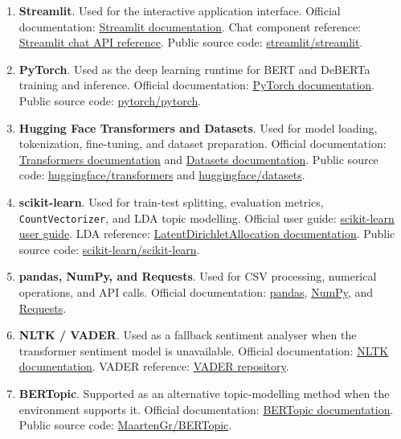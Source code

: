 \documentclass[11pt]{article}
\newcommand{\code}[1]{\texttt{#1}}
\begin{document}
\begin{enumerate}
    \item \textbf{Streamlit}. Used for the interactive application interface.
    Official documentation: \href{https://docs.streamlit.io/}{Streamlit documentation}. Chat component reference:
    \href{https://docs.streamlit.io/develop/api-reference/chat}{Streamlit chat API reference}. Public source code:
    \href{https://github.com/streamlit/streamlit}{streamlit/streamlit}.

    \item \textbf{PyTorch}. Used as the deep learning runtime for BERT and
    DeBERTa training and inference. Official documentation:
    \href{https://docs.pytorch.org/docs/stable/index.html}{PyTorch documentation}. Public source code:
    \href{https://github.com/pytorch/pytorch}{pytorch/pytorch}.

    \item \textbf{Hugging Face Transformers and Datasets}. Used for model
    loading, tokenization, fine-tuning, and dataset preparation. Official documentation:
    \href{https://huggingface.co/docs/transformers}{Transformers documentation} and
    \href{https://huggingface.co/docs/datasets}{Datasets documentation}. Public source code:
    \href{https://github.com/huggingface/transformers}{huggingface/transformers} and
    \href{https://github.com/huggingface/datasets}{huggingface/datasets}.

    \item \textbf{scikit-learn}. Used for train-test splitting, evaluation
    metrics, \code{CountVectorizer}, and LDA topic modelling. Official user guide:
    \href{https://scikit-learn.org/stable/user_guide.html}{scikit-learn user guide}. LDA reference:
    \href{https://scikit-learn.org/stable/modules/generated/sklearn.decomposition.LatentDirichletAllocation.html}{LatentDirichletAllocation documentation}. Public source code:
    \href{https://github.com/scikit-learn/scikit-learn}{scikit-learn/scikit-learn}.

    \item \textbf{pandas, NumPy, and Requests}. Used for CSV processing,
    numerical operations, and API calls. Official documentation:
    \href{https://pandas.pydata.org/pandas-docs/stable/}{pandas},
    \href{https://numpy.org/doc/stable/}{NumPy}, and
    \href{https://requests.readthedocs.io/}{Requests}.

    \item \textbf{NLTK / VADER}. Used as a fallback sentiment analyser when the
    transformer sentiment model is unavailable. Official documentation:
    \href{https://www.nltk.org/}{NLTK documentation}. VADER reference:
    \href{https://github.com/cjhutto/vaderSentiment}{VADER repository}.

    \item \textbf{BERTopic}. Supported as an alternative topic-modelling method when the environment supports it. Official documentation:
    \href{https://maartengr.github.io/BERTopic/}{BERTopic documentation}. Public source code:
    \href{https://github.com/MaartenGr/BERTopic}{MaartenGr/BERTopic}.
\end{enumerate}
\end{document}
